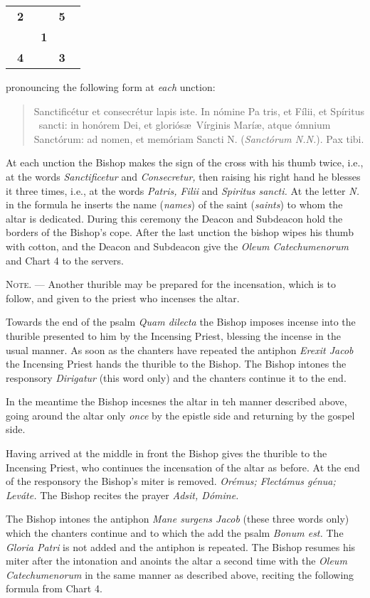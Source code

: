 \documentclass[letterpaper]{report}
\newcommand\crossplan{
\begin{center}
    \begin{tabular}{ | l c r | }
       \hline
       \cross\ \textbf{2} &                    & \textbf{5} \cross\ \\
                          & \cross\ \textbf{1} &                    \\
       \cross\ \textbf{4} &                    & \textbf{3} \cross\ \\
       \hline
   \end{tabular} 
\end{center}
}
\begin{document}
{\crossplan

pronouncing the following form at \textit{each} unction:

\begin{quote}
    Sancti\cross ficétur et conse\cross crétur lapis iste. In nómine Pa\cross
    tris, et Fí\cross lii, et Spíritus \cross\ sancti: in honórem Dei, et
    gloriós\ae\ Vírginis Marí\ae, atque ómnium Sanctórum: ad nomen, et memóriam
    Sancti N. (\textit{Sanctórum N.N.}). Pax tibi.
\end{quote}

At each unction the Bishop makes the sign of the cross with his thumb twice,
i.e., at the words \textit{Sanctificetur} and \textit{Consecretur,} then
raising his right hand he blesses it three times, i.e., at the words
\textit{Patris, Filii} and \textit{Spiritus sancti.} At the letter \textit{N.}
in the formula he inserts the name (\textit{names}) of the saint
(\textit{saints}) to whom the altar is dedicated. During this ceremony the
Deacon and Subdeacon hold the borders of the Bishop's cope. After the last
unction the bishop wipes his thumb with cotton, and the Deacon and Subdeacon
give the \textit{Oleum Catechumenorum} and Chart 4 to the servers.

\textsc{Note. ---} Another thurible may be prepared for the incensation, which
is to follow, and given to the priest who incenses the altar.

\rubric Towards the end of the psalm \textit{Quam dilecta} the Bishop imposes
incense into the thurible presented to him by the Incensing Priest, blessing
the incense in the usual manner. As soon as the chanters have repeated the
antiphon \textit{Erexit Jacob} the Incensing Priest hands the thurible to the
Bishop. The Bishop intones the responsory \textit{Dirigatur} (this word only)
and the chanters continue it to the end.

In the meantime the Bishop incesnes the altar in teh manner described above,
going around the altar only \textit{once} by the epistle side and returning by
the gospel side.

\rubric Having arrived at the middle in front the Bishop gives the thurible to
the Incensing Priest, who continues the incensation of the altar as before. At
the end of the responsory the Bishop's miter is removed. \textit{Orémus;
Flectámus génua; Leváte.} The Bishop recites the prayer \textit{Adsit, Dómine.}

\rubric The Bishop intones the antiphon \textit{Mane surgens Jacob} (these
three words only) which the chanters continue and to which the add the psalm
\textit{Bonum est.} The \textit{Gloria Patri} is not added and the antiphon is
repeated. The Bishop resumes his miter after the intonation and anoints the
altar a second time with the \textit{Oleum Catechumenorum} in the same manner
as described above, reciting the following formula from Chart 4.

}
\end{document}
